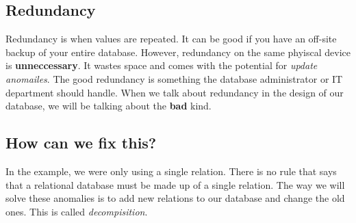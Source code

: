\documentclass{report}
\begin{document}
          \subsection{Redundancy}
          Redundancy is when values are repeated. It can be good if you have an off-site backup of your entire database. However, redundancy on the same phyiscal device is \textbf{unneccessary}. It wastes space and comes with the potential for \textit{update anomailes}.
          \bigbreak \noindent
          The good redundancy is something the database administrator or IT department should handle. When we talk about redundancy in the design of our database, we will be talking about the \textbf{bad} kind.
          \subsection{How can we fix this?}
          In the example, we were only using a single relation. There is no rule that says that a relational database must be made up of a single relation. The way we will solve these anomalies is to add new relations to our database and change the old ones. This is called \textit{decompisition}.
\end{document}

